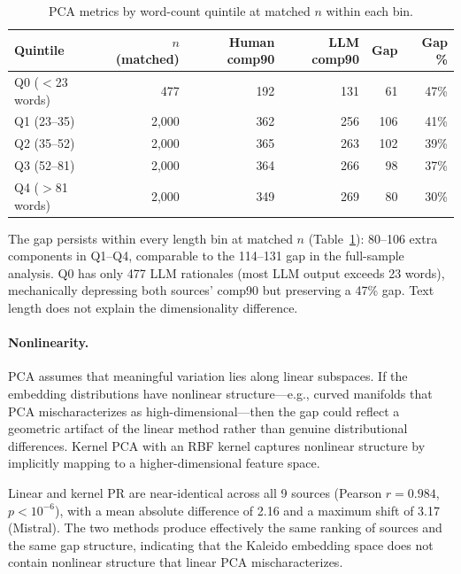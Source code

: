 \documentclass[11pt,a4paper]{article}
\begin{document}
\begin{table}[H]
\centering
\caption{PCA metrics by word-count quintile at matched $n$ within each bin.}
\label{tab:length_quintile}
\begin{tabular}{lrrrrr}
\toprule
Quintile & $n$ (matched) & Human comp90 & LLM comp90 & Gap & Gap \% \\
\midrule
Q0 ($<$23 words) & 477   & 192 & 131 & 61  & 47\% \\
Q1 (23--35)       & 2,000 & 362 & 256 & 106 & 41\% \\
Q2 (35--52)       & 2,000 & 365 & 263 & 102 & 39\% \\
Q3 (52--81)       & 2,000 & 364 & 266 & 98  & 37\% \\
Q4 ($>$81 words)  & 2,000 & 349 & 269 & 80  & 30\% \\
\bottomrule
\end{tabular}
\end{table}

The gap persists within every length bin at matched $n$ (Table~\ref{tab:length_quintile}): 80--106 extra components in Q1--Q4, comparable to the 114--131 gap in the full-sample analysis. Q0 has only 477 LLM rationales (most LLM output exceeds 23 words), mechanically depressing both sources' comp90 but preserving a 47\% gap. Text length does not explain the dimensionality difference.

\paragraph{Nonlinearity.} PCA assumes that meaningful variation lies along linear subspaces. If the embedding distributions have nonlinear structure---e.g., curved manifolds that PCA mischaracterizes as high-dimensional---then the gap could reflect a geometric artifact of the linear method rather than genuine distributional differences. Kernel PCA with an RBF kernel captures nonlinear structure by implicitly mapping to a higher-dimensional feature space.

Linear and kernel PR are near-identical across all 9 sources (Pearson $r = 0.984$, $p < 10^{-6}$), with a mean absolute difference of 2.16 and a maximum shift of 3.17 (Mistral). The two methods produce effectively the same ranking of sources and the same gap structure, indicating that the Kaleido embedding space does not contain nonlinear structure that linear PCA mischaracterizes.
\end{document}
